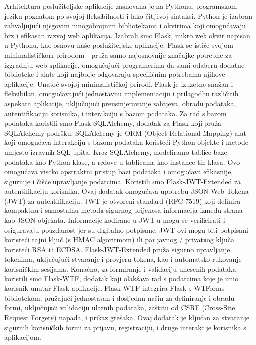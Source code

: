 \documentclass[times, utf8, zavrsni]{fer}
\begin{document}
Arhitektura poslužiteljske aplikacije zasnovana je na Pythonu, programskom jeziku poznatom po svojoj fleksibilnosti i lako čitljivoj sintaksi. Python je izabran zahvaljujući njegovim mnogobrojnim bibliotekama i okvirima koji omogućavaju brz i efikasan razvoj web aplikacija. Izabrali smo Flask, mikro web okvir napisan u Pythonu, kao osnovu naše poslužiteljske aplikacije. Flask se ističe svojom minimalističkom prirodom - pruža samo najosnovnije značajke potrebne za izgradnju web aplikacije, omogućujući programerima da sami odaberu dodatne biblioteke i alate koji najbolje odgovaraju specifičnim potrebama njihove aplikacije. Unatoč svojoj minimalističkoj prirodi, Flask je izuzetno snažan i fleksibilan, omogućavajući jednostavnu implementaciju i prilagodbu različitih aspekata aplikacije, uključujući preusmjeravanje zahtjeva, obradu podataka, autentifikaciju korisnika, i interakciju s bazom podataka. Za rad s bazom podataka koristili smo Flask-SQLAlchemy, dodatak za Flask koji pruža SQLAlchemy podršku. SQLAlchemy je ORM (Object-Relational Mapping) alat koji omogućava interakciju s bazom podataka koristeći Python objekte i metode umjesto izravnih SQL upita. Kroz SQLAlchemy, modeliramo tablice baze podataka kao Python klase, a redove u tablicama kao instance tih klasa. Ovo omogućava visoko apstraktni pristup bazi podataka i omogućava efikasnije, sigurnije i čišće upravljanje podatcima. Koristili smo Flask-JWT-Extended za autentifikaciju korisnika. Ovaj dodatak omogućava upotrebu JSON Web Tokena (JWT) za autentifikaciju. JWT je otvoreni standard (RFC 7519) koji definira kompaktnu i samostalnu metodu sigurnog prijenosa informacija između strana kao JSON objekata. Informacije kodirane u JWT-u mogu se verificirati i osiguravaju pouzdanost jer su digitalno potpisane. JWT-ovi mogu biti potpisani koristeći tajni ključ (s HMAC algoritmom) ili par javnog / privatnog ključa koristeći RSA ili ECDSA. Flask-JWT-Extended pruža sigurno upravljanje tokenima, uključujući stvaranje i provjeru tokena, kao i automatsko rukovanje korisničkim sesijama. Konačno, za formiranje i validaciju unesenih podataka koristili smo Flask-WTF, dodatak koji olakšava rad s podatcima koje je unio korisnik unutar Flask aplikacije. Flask-WTF integrira Flask s WTForms bibliotekom, pružajući jednostavan i dosljedan način za definiranje i obradu formi, uključujući validaciju ulaznih podataka, zaštitu od CSRF (Cross-Site Request Forgery) napada, i prikaz grešaka. Ovaj dodatak je ključan za stvaranje sigurnih korisničkih formi za prijavu, registraciju, i druge interakcije korisnika s aplikacijom.
\end{document}
